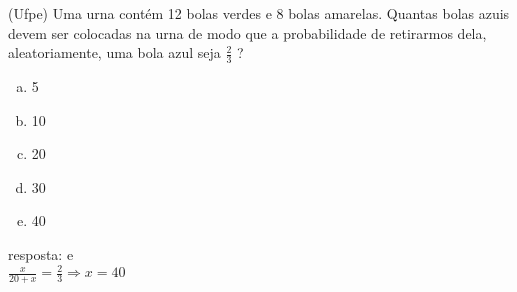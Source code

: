 \begin{ex}
(Ufpe) Uma urna contém 12 bolas verdes e 8 bolas amarelas. Quantas bolas azuis devem ser colocadas na urna de modo que a probabilidade de retirarmos dela, aleatoriamente, uma bola azul seja $\frac{2}{3}$ ?
   \begin{enumerate}[(a)]
   \item 5
   \item 10
   \item 20
   \item 30
   \item 40
   \end{enumerate}
     \begin{sol}
      resposta: e \\
      $\frac{x}{20+x}=\frac{2}{3}\Longrightarrow x=40$
     \end{sol}
\end{ex}